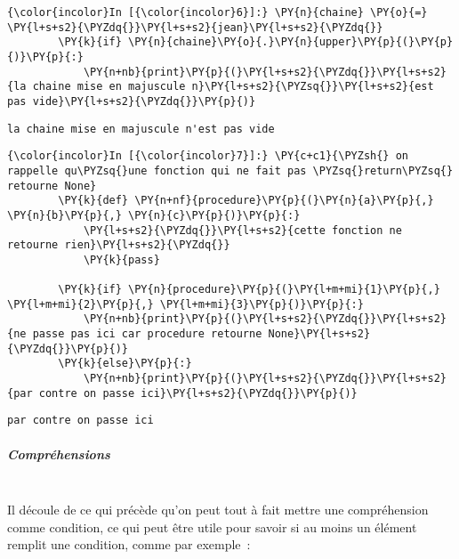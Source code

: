     \begin{Verbatim}[commandchars=\\\{\}]
{\color{incolor}In [{\color{incolor}6}]:} \PY{n}{chaine} \PY{o}{=} \PY{l+s+s2}{\PYZdq{}}\PY{l+s+s2}{jean}\PY{l+s+s2}{\PYZdq{}}
        \PY{k}{if} \PY{n}{chaine}\PY{o}{.}\PY{n}{upper}\PY{p}{(}\PY{p}{)}\PY{p}{:}
            \PY{n+nb}{print}\PY{p}{(}\PY{l+s+s2}{\PYZdq{}}\PY{l+s+s2}{la chaine mise en majuscule n}\PY{l+s+s2}{\PYZsq{}}\PY{l+s+s2}{est pas vide}\PY{l+s+s2}{\PYZdq{}}\PY{p}{)}
\end{Verbatim}


    \begin{Verbatim}[commandchars=\\\{\}]
la chaine mise en majuscule n'est pas vide

    \end{Verbatim}

    \begin{Verbatim}[commandchars=\\\{\}]
{\color{incolor}In [{\color{incolor}7}]:} \PY{c+c1}{\PYZsh{} on rappelle qu\PYZsq{}une fonction qui ne fait pas \PYZsq{}return\PYZsq{} retourne None}
        \PY{k}{def} \PY{n+nf}{procedure}\PY{p}{(}\PY{n}{a}\PY{p}{,} \PY{n}{b}\PY{p}{,} \PY{n}{c}\PY{p}{)}\PY{p}{:}
            \PY{l+s+s2}{\PYZdq{}}\PY{l+s+s2}{cette fonction ne retourne rien}\PY{l+s+s2}{\PYZdq{}}
            \PY{k}{pass}
        
        \PY{k}{if} \PY{n}{procedure}\PY{p}{(}\PY{l+m+mi}{1}\PY{p}{,} \PY{l+m+mi}{2}\PY{p}{,} \PY{l+m+mi}{3}\PY{p}{)}\PY{p}{:}
            \PY{n+nb}{print}\PY{p}{(}\PY{l+s+s2}{\PYZdq{}}\PY{l+s+s2}{ne passe pas ici car procedure retourne None}\PY{l+s+s2}{\PYZdq{}}\PY{p}{)}
        \PY{k}{else}\PY{p}{:}
            \PY{n+nb}{print}\PY{p}{(}\PY{l+s+s2}{\PYZdq{}}\PY{l+s+s2}{par contre on passe ici}\PY{l+s+s2}{\PYZdq{}}\PY{p}{)}
\end{Verbatim}


    \begin{Verbatim}[commandchars=\\\{\}]
par contre on passe ici

    \end{Verbatim}

    \hypertarget{compruxe9hensions}{%
\subparagraph{Compréhensions\\\\}\label{compruxe9hensions}}

    Il découle de ce qui précède qu'on peut tout à fait mettre une
compréhension comme condition, ce qui peut être utile pour savoir si au
moins un élément remplit une condition, comme par exemple~:

